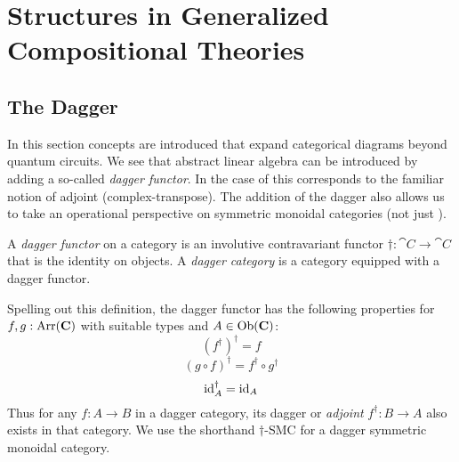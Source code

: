 \chapter{Structures in Generalized Compositional Theories}
\label{chap:cqm}


\section{The Dagger}
In this section concepts are introduced that expand categorical diagrams beyond quantum circuits. We see that abstract linear algebra can be introduced by adding a so-called \emph{dagger functor}.  In the case of  this corresponds to the familiar notion of adjoint (complex-transpose).  The addition of the dagger also allows us to take an operational perspective on symmetric monoidal categories (not just ). 

\begin{defn}
\label{defn:dagger}
A \emph{dagger functor} on a category  is an involutive contravariant functor $\dagger:\cat{C}\to\cat{C}$ that is the identity on objects. A \emph{dagger category} is a category equipped with a dagger functor.
\end{defn}
Spelling out this definition, the dagger functor has the following properties for $f,g:\mbox{Arr}(\mathbf{C})$ with suitable types and $A\in\mbox{Ob}(\mathbf{C})$:
\begin{equation}
\left(f^{\dagger}\right)^{\dagger} = f 
\end{equation}
\begin{equation}
(g\circ f)^{\dagger} = f^{\dagger}\circ g^{\dagger}
\end{equation}
\begin{equation}
\mbox{id}_{A}^{\dagger} = \mbox{id}_{A}
\end{equation}
Thus for any $f:A\to B$ in a dagger category, its dagger or \emph{adjoint} $f^{\dagger}:B\to A$ also exists in that category. We use the shorthand $\dagger$-SMC for a dagger symmetric monoidal category.

